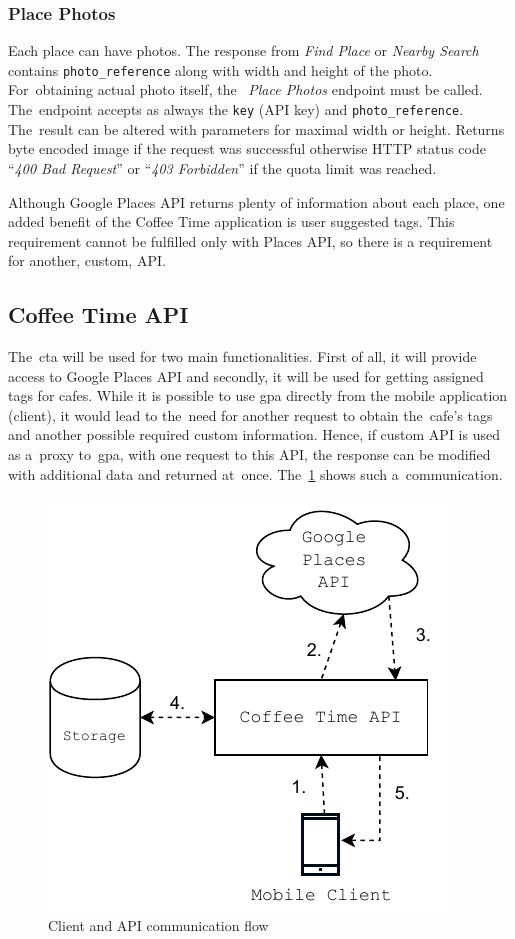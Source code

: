 \subsubsection{Place Photos}
Each place can have photos. The response from \textit{Find Place} or \textit{Nearby Search} contains \verb|photo_reference| along with width and height of the photo. For~obtaining actual photo itself, the~ \textit{Place Photos} endpoint must be called. The~endpoint accepts as always the \verb|key| (API key) and \verb|photo_reference|. The~result can be altered with parameters for maximal width or height. Returns byte encoded image if the request was successful otherwise HTTP status code ``\textit{400 Bad Request}'' or ``\textit{403 Forbidden}'' if the quota limit was reached. 

Although Google Places API returns plenty of information about each place, one added benefit of the Coffee Time application is user suggested tags. This requirement cannot be fulfilled only with Places API, so there is a requirement for another, custom, API. 
\subsection{Coffee Time API}
The~\gls{cta} will be used for two main functionalities. First of all, it will provide access to Google Places API and secondly, it will be used for getting assigned tags for cafes. While it is possible to use \gls{gpa} directly from the mobile application (client), it would lead to the~need for another request to obtain the~cafe's tags and another possible required custom information. Hence, if custom API is used as a~proxy to~\gls{gpa}, with one request to this API, the response can be modified with additional data and returned at~once. The~\cref{fig:api-communication} shows such a~communication. 

\begin{figure}[ht]
    \centering
    \includegraphics[width=0.5\linewidth]{img/analysis/api-communication-flow.pdf}
    \caption{Client and API communication flow}
    \label{fig:api-communication}
\end{figure}

